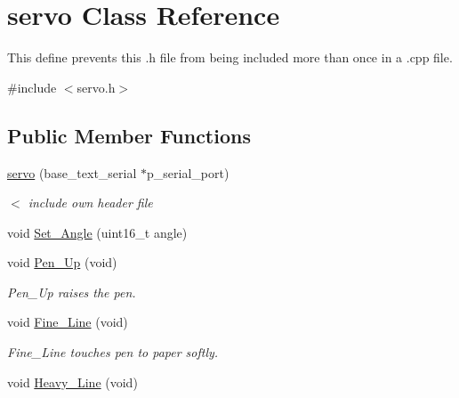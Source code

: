 \hypertarget{classservo}{\section{servo Class Reference}
\label{classservo}
}


This define prevents this .h file from being included more than once in a .cpp file.  




{\ttfamily \#include $<$servo.\-h$>$}

\subsection*{Public Member Functions}
\begin{DoxyCompactItemize}
\item 
\hyperlink{classservo_a7b755565320b23fbbb6f503592576451}{servo} (base\-\_\-text\-\_\-serial $\ast$p\-\_\-serial\-\_\-port)
\begin{DoxyCompactList}\small\item\em $<$ include own header file \end{DoxyCompactList}\item 
void \hyperlink{classservo_a0c3ccbb231e64ef9d4d594b6a257fede}{Set\-\_\-\-Angle} (uint16\-\_\-t angle)
\item 
\hypertarget{classservo_a0f6663b0fba3ed965886d1b7b2c096ff}{void \hyperlink{classservo_a0f6663b0fba3ed965886d1b7b2c096ff}{Pen\-\_\-\-Up} (void)}\label{classservo_a0f6663b0fba3ed965886d1b7b2c096ff}

\begin{DoxyCompactList}\small\item\em Pen\-\_\-\-Up raises the pen. \end{DoxyCompactList}\item 
\hypertarget{classservo_aa896489169396a9627cf91a69866c314}{void \hyperlink{classservo_aa896489169396a9627cf91a69866c314}{Fine\-\_\-\-Line} (void)}\label{classservo_aa896489169396a9627cf91a69866c314}

\begin{DoxyCompactList}\small\item\em Fine\-\_\-\-Line touches pen to paper softly. \end{DoxyCompactList}\item 
\hypertarget{classservo_a0fdfeb3b032f684bf02e1d8c2f631a89}{void \hyperlink{classservo_a0fdfeb3b032f684bf02e1d8c2f631a89}{Heavy\-\_\-\-Line} (void)}\label{classservo_a0fdfeb3b032f684bf02e1d8c2f631a89}


\end{DoxyCompactItemize}
